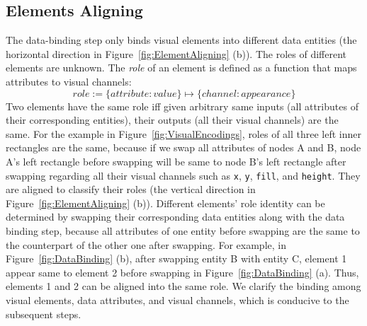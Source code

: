 \subsection{Elements Aligning}
The data-binding step only binds visual elements into different data entities (the horizontal direction in Figure~\ref{fig:ElementAligning} (b)).
The roles of different elements are unknown.
The \textit{role} of an element is defined as a function that maps attributes to visual channels:
\begin{equation}
    role :=  \{attribute: value\} \mapsto \{channel: appearance\}
\end{equation}
Two elements have the same role iff given arbitrary same inputs (all attributes of their corresponding entities), their outputs (all their visual channels) are the same.
For the example in Figure~\ref{fig:VisualEncodings}, 
roles of all three left inner rectangles are the same,
because if we swap all attributes of nodes A and B, node A's left rectangle before swapping will be same to node B's left rectangle after swapping regarding all their visual channels such as \texttt{x}, \texttt{y}, \texttt{fill}, and \texttt{height}.
They are aligned to classify their roles (the vertical direction in Figure~\ref{fig:ElementAligning} (b)).
Different elements' role identity can be determined by swapping their corresponding data entities along with the data binding step, because all attributes of one entity before swapping are the same to the counterpart of the other one after swapping.
For example, in Figure~\ref{fig:DataBinding} (b), after swapping entity B with entity C, element 1 appear same to element 2 before swapping in Figure~\ref{fig:DataBinding} (a). Thus, elements 1 and 2 can be aligned into the same role.
We clarify the binding among visual elements, data attributes, and visual channels, which is conducive to the subsequent steps.


